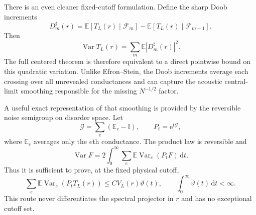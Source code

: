 \documentclass[11pt]{article}
\theoremstyle{definition}
\theoremstyle{remark}
\newcommand{\e}{\mathrm e}
\newcommand{\Id}{\mathbb I}
\newcommand{\E}{\mathbb E}
\newcommand{\Var}{\operatorname{Var}}
\newcommand{\abs}[1]{\left\lvert #1\right\rvert}
\newcommand{\dd}{\,\mathrm d}
\begin{document}
There is an even cleaner fixed-cutoff formulation.  Define the sharp Doob
increments
\begin{equation}
 D_m^\sharp(r)=\E[T_L(r)\mid\mathcal F_m]
 -\E[T_L(r)\mid\mathcal F_{m-1}].
 \label{eq:sharp-Doob-increments}
\end{equation}
Then
\begin{equation}
 \boxed{
 \Var T_L(r)=\sum_m\E\abs{D_m^\sharp(r)}^2.}
 \label{eq:sharp-Doob-identity}
\end{equation}
The full centered theorem is therefore equivalent to a direct pointwise bound
on this quadratic variation.  Unlike Efron--Stein, the Doob increments average
each crossing over all unrevealed conductances and can capture the acoustic
central-limit smoothing responsible for the missing $N^{-1/2}$ factor.

A useful exact representation of that smoothing is provided by the reversible
noise semigroup on disorder space.  Let
\begin{equation}
 \mathscr G=\sum_e(\E_e-\Id),
 \qquad
 P_t=\e^{t\mathscr G},
 \label{eq:product-resampling-semigroup}
\end{equation}
where $\E_e$ averages only the $e$th conductance.  The product law is
reversible and
\begin{equation}
 \boxed{
 \Var F=2\int_0^\infty
 \sum_e\E\Var_e(P_tF)\dd t.}
 \label{eq:disorder-noise-variance-representation}
\end{equation}
Thus it is sufficient to prove, at the fixed physical cutoff,
\begin{equation}
 \sum_e\E\Var_e(P_tT_L(r))
 \le C V_L(r)\vartheta(t),
 \qquad
 \int_0^\infty\vartheta(t)\dd t<\infty.
 \label{eq:noise-energy-target}
\end{equation}
This route never differentiates the spectral projector in $r$ and has no
exceptional cutoff set.
\end{document}
